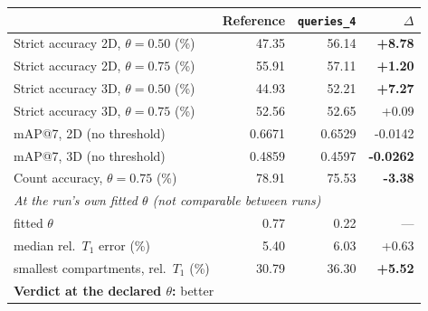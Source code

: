 \renewcommand{\arraystretch}{1.05}
\begin{tabular}{lrrr}
\toprule
 & Reference & \texttt{queries\_4} & $\Delta$ \\
\midrule
Strict accuracy 2D, $\theta = 0.50$ (\%) & 47.35 & 56.14 & \textbf{+8.78} \\
Strict accuracy 2D, $\theta = 0.75$ (\%) & 55.91 & 57.11 & \textbf{+1.20} \\
Strict accuracy 3D, $\theta = 0.50$ (\%) & 44.93 & 52.21 & \textbf{+7.27} \\
Strict accuracy 3D, $\theta = 0.75$ (\%) & 52.56 & 52.65 & +0.09 \\
\midrule
mAP@7, 2D (no threshold) & 0.6671 & 0.6529 & -0.0142 \\
mAP@7, 3D (no threshold) & 0.4859 & 0.4597 & \textbf{-0.0262} \\
\midrule
Count accuracy, $\theta = 0.75$ (\%) & 78.91 & 75.53 & \textbf{-3.38} \\
\midrule
\multicolumn{4}{l}{\emph{At the run's own fitted $\theta$ (not comparable between runs)}} \\
\quad fitted $\theta$ & 0.77 & 0.22 & --- \\
\quad median rel.\ $T_1$ error (\%) & 5.40 & 6.03 & +0.63 \\
\quad smallest compartments, rel.\ $T_1$ (\%) & 30.79 & 36.30 & \textbf{+5.52} \\
\midrule
\multicolumn{4}{l}{\textbf{Verdict at the declared $\theta$:} better} \\
\bottomrule
\end{tabular}
